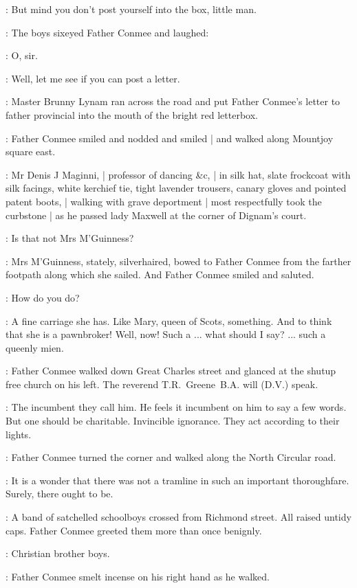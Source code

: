 \conmee:
But mind you don't post yourself into the box, little man.

:
The boys sixeyed Father Conmee and laughed:

\Boys:
O, sir.

\conmee:
Well, let me see if you can post a letter.

:
Master Brunny Lynam ran across the road
and put Father Conmee's letter to father provincial
into the mouth of the bright red letterbox.

:
Father Conmee smiled and nodded and smiled |
and walked along Mountjoy square east.

:
Mr Denis J Maginni, |
professor of dancing \&c, |
in silk hat,
slate frockcoat with silk facings,
white kerchief tie,
tight lavender trousers,
canary gloves
and pointed patent boots, |
walking with grave deportment |
most respectfully took the curbstone |
as he passed lady Maxwell
at the corner of Dignam's court.

\conmeeint:
Is that not Mrs M'Guinness?

:
Mrs M'Guinness,
stately, silverhaired,
bowed to Father Conmee from the farther footpath
along which she sailed.
And Father Conmee smiled and saluted.

\conmee:
How do you do?

\conmeeint:
A fine carriage she has.
Like Mary, queen of Scots, something.
And to think that she is a pawnbroker!
Well, now!
Such a ...
what should I say? ...
such a queenly mien.

:
Father Conmee walked down Great Charles street
and glanced at the shutup free church on his left.
The reverend T.R.~Greene~B.A. will (D.V.) speak.

\conmeeint:
The incumbent they call him.
He feels it incumbent on him to say a few words.
But one should be charitable.
Invincible ignorance.
They act according to their lights.

:
Father Conmee turned the corner
and walked along the North Circular road.

\conmeeint:
It is a wonder that there was not a tramline
in such an important thoroughfare.
Surely, there ought to be.

:
A band of satchelled schoolboys crossed from Richmond street.
All raised untidy caps.
Father Conmee greeted them more than once benignly.

\conmeeint:
Christian brother boys.

:
Father Conmee smelt incense on his right hand as he walked.

